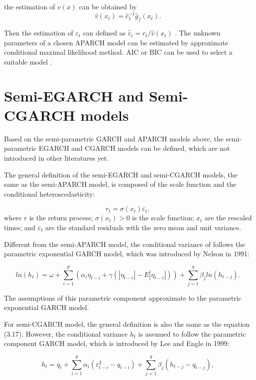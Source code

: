 the estimation of $v(x)$ can be obtained by
\[\hat{v}(x_t)=\hat{c}_1^{-1}\hat{g}_f(x_t).\]

Then the estimation of $\varepsilon_t$ can defined as $\hat{\varepsilon}_t=r_t/\hat{v}(x_t)$ . The unknown parameters of a chosen APARCH model can be estimated by  approximate conditional maximal likelihood method. AIC or BIC can be used to select a suitable model \citep{FengYuanhua;Sun2013}.

\section{Semi-EGARCH and Semi-CGARCH models}
Based on the semi-parametric GARCH and APARCH models above, the semi-parametric EGARCH and CGARCH models can be defined, which are not introduced in other literatures yet.

The general definition of the semi-EGARCH and semi-CGARCH models, the same as the semi-APARCH model, is composed of the scale function and the conditional heteroscedasticity:

\begin{equation}
r_{t} = \sigma(x_{t})\varepsilon_{t},
\end{equation}
where $r$ is the return process; $\sigma(x_{t})>0$ is the scale function; $x_{t}$  are the rescaled times; and  $\varepsilon_{t}$ are the standard residuals with the zero mean and unit variance. 

Different from the semi-APARCH model, the conditional variance of   follows the parametric exponential GARCH model, which was introduced by Nelson in 1991:

\begin{equation}
ln(h_t) =\omega + \sum_{i=1}^p(\alpha_i\eta_{t-i}+\gamma(|\eta_{t-i}|-E|\eta_{t-i}|))+\sum_{j=1}^q\beta_jln(h_{t-j}).
\end{equation}

The assumptions of this parametric component approximate to the parametric exponential GARCH model.

For semi-CGARCH model, the general definition is also the same as the equation (3.17). However, the conditional variance $h_t$ is assumed to follow the parametric component GARCH model, which is introduced by Lee and Engle in 1999:

\begin{equation}
h_{t}=q_{t}+\sum_{i=1}^{p}\alpha_{i}(\varepsilon_{t-i}^{2}-q_{t-i}) + \sum_{j=1}^{q}\beta_{j}(h_{t-j}-q_{t-j}),
\end{equation}

